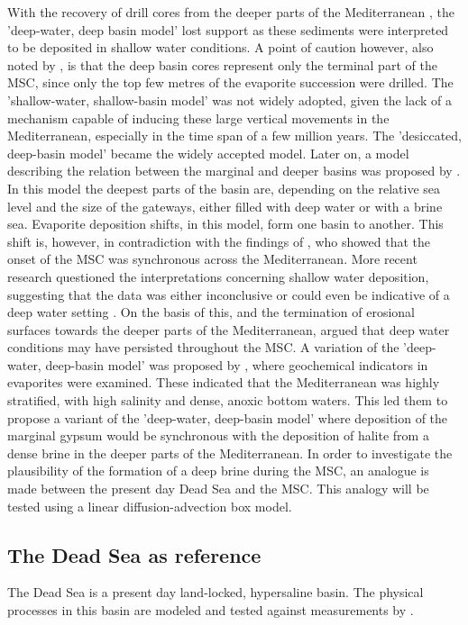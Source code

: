 \documentclass[twocolumn]{article}
\begin{document}
With the recovery of drill cores from the deeper parts of the Mediterranean \citep{hsu1972origin}, the 'deep-water, deep basin model' lost support as these sediments were interpreted to be deposited in shallow water conditions. A point of caution however, also noted by \cite{nesteroff1973mineralogy}, is that the deep basin cores represent only the terminal part of the MSC, since only the top few metres of the evaporite succession were drilled. The 'shallow-water, shallow-basin model' was not widely adopted, given the lack of a mechanism capable of inducing these large vertical movements in the Mediterranean, especially in the time span of a few million years. The 'desiccated, deep-basin model' became the widely accepted model. 
Later on, a model describing the relation between the marginal and deeper basins was proposed by \cite{rouchy2006messinian}. In this model the deepest parts of the basin are, depending on the relative sea level and the size of the gateways, either filled with deep water or with a brine sea. Evaporite deposition shifts, in this model, form one basin to another. This shift is, however, in contradiction with the findings of \cite{krijgsman2002onset}, who showed that the onset of the MSC was synchronous across the Mediterranean. 
More recent research questioned the interpretations concerning shallow water deposition, suggesting that the data was either inconclusive or could even be indicative of a deep water setting \citep{hardie2004did, roveri2001mediterranean}. On the basis of this, and the termination of erosional surfaces towards the deeper parts of the Mediterranean, \cite{roveri2014messinian} argued that deep water conditions may have persisted throughout the MSC. 
A variation of the 'deep-water, deep-basin model' was proposed by \cite{garcia2018geochemical}, where geochemical indicators in evaporites were examined. These indicated that the Mediterranean was highly stratified, with high salinity and dense, anoxic bottom waters. This led them to propose a variant of the 'deep-water, deep-basin model' where deposition of the marginal gypsum would be synchronous with the deposition of halite from a dense brine in the deeper parts of the Mediterranean. In order to investigate the plausibility of the formation of a deep brine during the MSC, an analogue is made between the present day Dead Sea and the MSC. This analogy will be tested using a linear diffusion-advection box model.

\subsection{The Dead Sea as reference}
The Dead Sea is a present day land-locked, hypersaline basin. The physical processes in this basin are modeled and tested against measurements by \cite{Heiden2017Application}.
\end{document}
